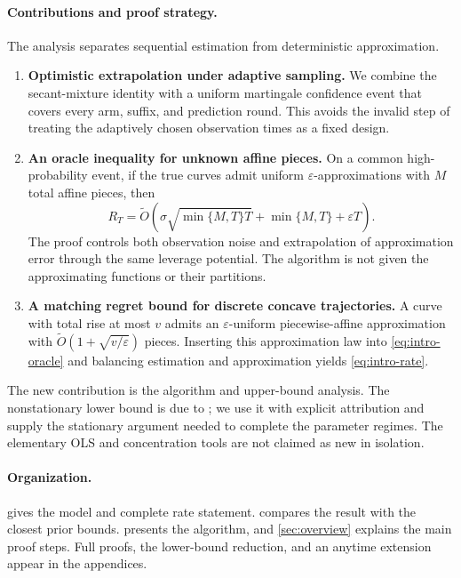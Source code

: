\documentclass[11pt]{article}
\theoremstyle{remark}
\begin{document}
\paragraph{Contributions and proof strategy.}
The analysis separates sequential estimation from deterministic approximation.
\begin{enumerate}
\item \textbf{Optimistic extrapolation under adaptive sampling.} We combine the secant-mixture identity with a uniform martingale confidence event that covers every arm, suffix, and prediction round. This avoids the invalid step of treating the adaptively chosen observation times as a fixed design.
\item \textbf{An oracle inequality for unknown affine pieces.} On a common high-probability event, if the true curves admit uniform $\varepsilon$-approximations with $M$ total affine pieces, then
\begin{equation}\label{eq:intro-oracle}
R_T=\widetilde O\!\left(\sigma\sqrt{\min\{M,T\}T}+\min\{M,T\}+\varepsilon T\right).
\end{equation}
The proof controls both observation noise and extrapolation of approximation error through the same leverage potential. The algorithm is not given the approximating functions or their partitions.
\item \textbf{A matching regret bound for discrete concave trajectories.} A curve with total rise at most $v$ admits an $\varepsilon$-uniform piecewise-affine approximation with $\widetilde O(1+\sqrt{v/\varepsilon})$ pieces. Inserting this approximation law into \eqref{eq:intro-oracle} and balancing estimation and approximation yields \eqref{eq:intro-rate}.
\end{enumerate}
The new contribution is the algorithm and upper-bound analysis. The nonstationary lower bound is due to \citet{migali2025tightening}; we use it with explicit attribution and supply the stationary argument needed to complete the parameter regimes. The elementary OLS and concentration tools are not claimed as new in isolation.

\paragraph{Organization.}
 gives the model and complete rate statement.  compares the result with the closest prior bounds.  presents the algorithm, and \cref{sec:overview} explains the main proof steps. Full proofs, the lower-bound reduction, and an anytime extension appear in the appendices.
\end{document}
